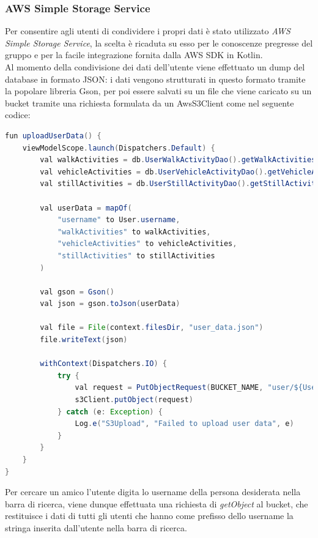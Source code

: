 \documentclass{article}
\begin{document}
    \subsubsection*{AWS Simple Storage Service}
    Per consentire agli utenti di condividere i propri dati è stato utilizzato \textit{AWS Simple Storage Service}, la scelta è ricaduta su esso per le conoscenze pregresse del gruppo e per la facile integrazione fornita dalla AWS SDK in Kotlin.\\
    Al momento della condivisione dei dati dell'utente viene effettuato un dump del database in formato JSON: i dati vengono strutturati in questo formato tramite la popolare libreria Gson, per poi essere salvati su un file che viene caricato su un bucket tramite una richiesta formulata da un AwsS3Client come nel seguente codice:\\
    \begin{lstlisting}[language=Java]
fun uploadUserData() {
    viewModelScope.launch(Dispatchers.Default) {
        val walkActivities = db.UserWalkActivityDao().getWalkActivitiesByUserId(User.id)
        val vehicleActivities = db.UserVehicleActivityDao().getVehicleActivitiesByUserId(User.id)
        val stillActivities = db.UserStillActivityDao().getStillActivitiesByUserId(User.id)

        val userData = mapOf(
            "username" to User.username,
            "walkActivities" to walkActivities,
            "vehicleActivities" to vehicleActivities,
            "stillActivities" to stillActivities
        )

        val gson = Gson()
        val json = gson.toJson(userData)

        val file = File(context.filesDir, "user_data.json")
        file.writeText(json)

        withContext(Dispatchers.IO) {
            try {
                val request = PutObjectRequest(BUCKET_NAME, "user/${User.username}.json", file)
                s3Client.putObject(request)
            } catch (e: Exception) {
                Log.e("S3Upload", "Failed to upload user data", e)
            }
        }
    }
}
    \end{lstlisting}
    Per cercare un amico l'utente digita lo username della persona desiderata nella barra di ricerca, viene dunque effettuata una richiesta di \textit{getObject} al bucket, che restituisce i dati di tutti gli utenti che hanno come prefisso dello username la stringa inserita dall'utente nella barra di ricerca.
\end{document}
